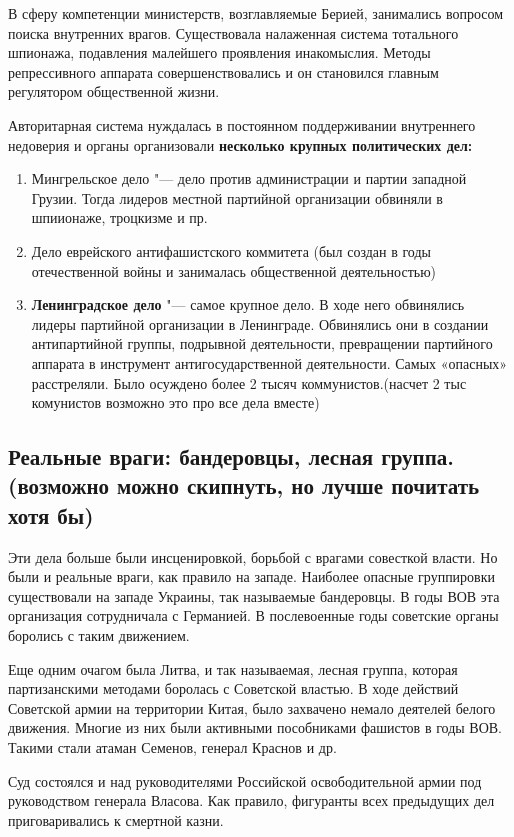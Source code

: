 В сферу компетенции министерств, возглавляемые Берией, занимались вопросом поиска внутренних врагов. Существовала налаженная система тотального шпионажа, подавления малейшего проявления инакомыслия. Методы репрессивного аппарата совершенствовались и он становился главным регулятором общественной жизни. 

Авторитарная система нуждалась в постоянном поддерживании внутреннего недоверия и органы организовали \textbf{несколько крупных политических дел:} 

\begin{enumerate}
    \item Мингрельское дело "--- дело против администрации и партии западной Грузии. Тогда лидеров местной партийной организации обвиняли в шпиионаже, троцкизме и пр.
    \item Дело еврейского антифашистского коммитета (был создан в годы отечественной войны и занималась общественной деятельностью)
    \item \textbf{Ленинградское дело} "--- самое крупное дело. В ходе него обвинялись лидеры партийной организации в Ленинграде. Обвинялись они в создании антипартийной группы, подрывной деятельности, превращении партийного аппарата в инструмент антигосударственной деятельности. Самых «опасных» расстреляли. Было осуждено более 2 тысяч коммунистов.(насчет 2 тыс комунистов возможно это про все дела вместе)
\end{enumerate}

\subsection{Реальные враги: бандеровцы, лесная группа.(возможно можно скипнуть, но лучше почитать хотя бы)}

Эти дела больше были инсценировкой, борьбой с врагами совесткой власти. Но были и реальные враги, как правило на западе. Наиболее опасные группировки существовали на западе Украины, так называемые бандеровцы. В годы ВОВ эта организация сотрудничала с Германией. В послевоенные годы советские органы боролись с таким движением.

Еще одним очагом была Литва, и так называемая, лесная группа, которая партизанскими методами боролась с Советской властью. В ходе действий Советской армии на территории Китая, было захвачено немало деятелей белого движения. Многие из них были активными пособниками фашистов в годы ВОВ. Такими стали атаман Семенов, генерал Краснов и др.

Суд состоялся и над руководителями Российской освободительной армии под руководством генерала Власова. Как правило, фигуранты всех предыдущих дел приговаривались к смертной казни.

